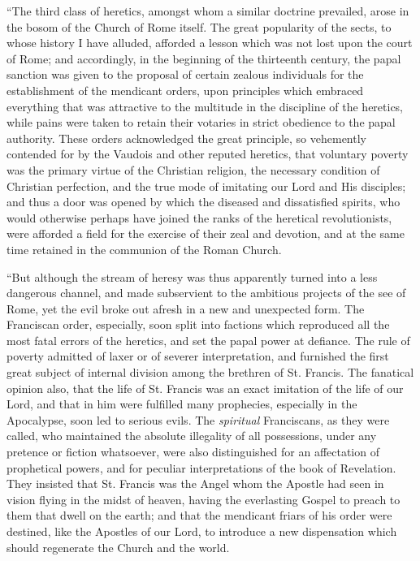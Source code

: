 ``The third class of heretics, amongst whom a similar doctrine
prevailed, arose in the bosom of the Church of Rome itself. The great
popularity of the sects, to whose history I have alluded, afforded a
lesson which was not lost upon the court of Rome; and accordingly, in
the beginning of the thirteenth century, the papal sanction was given
to the proposal of certain zealous individuals for the establishment
of the mendicant orders, upon principles which embraced everything
that was attractive to the multitude in the discipline of the
heretics, while pains were taken to retain their votaries in strict
obedience to the papal authority. These orders acknowledged the great
principle, so vehemently contended for by the Vaudois and other
reputed heretics, that voluntary poverty was the primary virtue of the
Christian religion, the necessary condition of Christian perfection,
and the true mode of imitating our Lord and His disciples; and thus a
door was opened by which the diseased and dissatisfied spirits, who
would otherwise perhaps have joined the ranks of the heretical
revolutionists, were afforded a field for the exercise of their zeal
and devotion, and at the same time retained in the communion of the
Roman Church.

``But although the stream of heresy was thus apparently turned
into a less dangerous channel, and made subservient to the ambitious
projects of the see of Rome, yet the evil broke out afresh in a new
and unexpected form. The Franciscan order, especially, soon split into
factions which reproduced all the most fatal errors of the heretics,
and set the papal power at defiance. The rule of poverty admitted of
laxer or of severer interpretation, and furnished the first great
subject of internal division among the brethren of St. Francis. The
fanatical opinion also, that the life of St. Francis was an exact
imitation of the life of our Lord, and that in him were fulfilled many
prophecies, especially in the Apocalypse, soon led to serious evils.
The \emph{spiritual} Franciscans, as they were called, who maintained
the absolute illegality of all possessions, under any pretence or
fiction whatsoever, were also distinguished for an affectation of
prophetical powers, and for peculiar interpretations of the book of
Revelation. They insisted that St. Francis
was the Angel whom the Apostle had seen in vision flying in the midst
of heaven, having the everlasting Gospel to preach to them that dwell
on the earth; and that the mendicant friars of his order were
destined, like the Apostles of our Lord, to introduce a new
dispensation which should regenerate the Church and the world.

